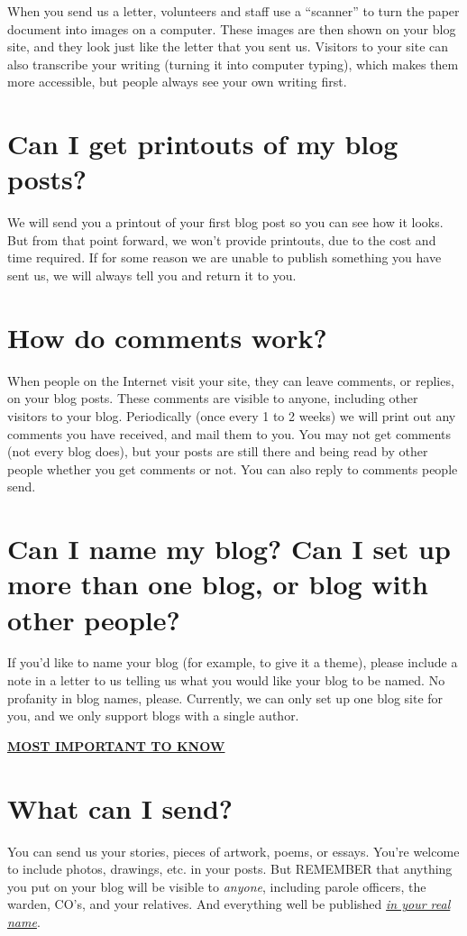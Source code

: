 \documentclass[12pt]{article}
\begin{document}
{{{{{{{{{{{{{{{{{%
When you send us a letter, volunteers and staff use a ``scanner'' to turn the paper document into images on a computer.  These images are then shown on your blog site, and they look just like the letter that you sent us.  Visitors to your site can also transcribe your writing (turning it into computer typing), which makes them more accessible, but people always see your own writing first.
{%

{%
\section*{Can I get printouts of my blog posts?}
We will send you a printout of your first blog post so you can see how it looks.  But from that point forward, we won't provide printouts, due to the cost and time required.  If for some reason we are unable to publish something you have sent us, we will always tell you and return it to you.
{%

{%
\section*{How do comments work?}
When people on the Internet visit your site, they can leave comments, or replies, on your blog posts.  These comments are visible to anyone, including other visitors to your blog.  Periodically (once every 1 to 2 weeks) we will print out any comments you have received, and mail them to you.  You may not get comments (not every blog does), but your posts are still there and being read by other people whether you get comments or not.  You can also reply to comments people send.
{%

{%
\section*{Can I name my blog?  Can I set up more than one blog, or blog with other people?}
If you'd like to name your blog (for example, to give it a theme), please include a note in a  letter to us telling us what you would like your blog to be named.  No profanity in blog names, please.  Currently, we can only set up one blog site for you, and we only support blogs with a single author.
{%

{%
\pagebreak
\centerline{ {\bf \underline{ MOST IMPORTANT TO KNOW }}}
{%

{%
\section*{What can I send?}
You can send us your stories, pieces of artwork, poems, or essays.  You're welcome to include photos, drawings, etc. in your posts.  But REMEMBER that anything you put on your blog will be visible to \emph{anyone}, including parole officers, the warden, CO's, and your relatives.  And everything well be published \emph{\underline{in your real name}}.
{%

}}}}}}}}}}}}}}}}}}}}}}}}}}}}
\end{document}
